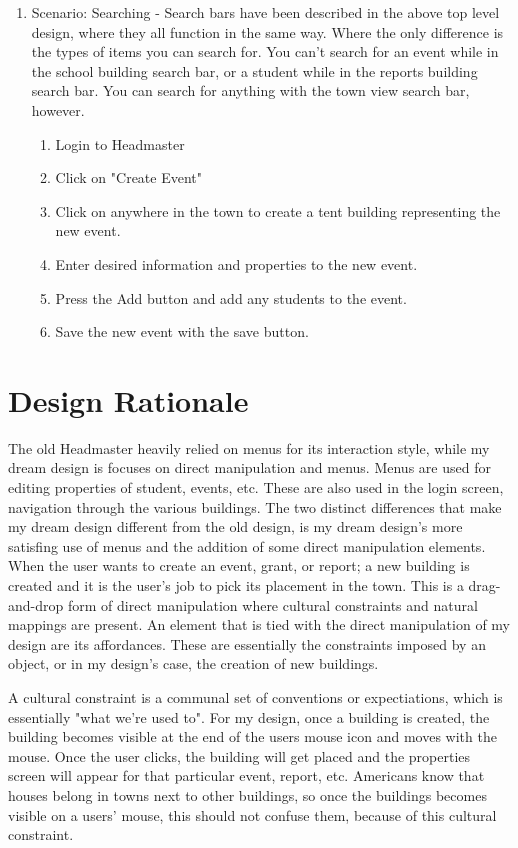 \documentclass[11pt]{article}
\begin{document}
\begin{enumerate}
    \item Scenario: Searching -
Search bars have been described in the above top level design, where they all function in the same way. Where the only difference is the types of items you can search for. You can't search for an event while in the school building search bar, or a student while in the reports building search bar. You can search for anything with the town view search bar, however.
  \begin{enumerate}
        \item Login to Headmaster
        \item Click on "Create Event"
        \item Click on anywhere in the town to create a tent building representing the new event.
        \item Enter desired information and properties to the new event.
        \item Press the Add button and add any students to the event.
        \item Save the new event with the save button.
  \end{enumerate}
\end{enumerate}

\section{Design Rationale}
The old Headmaster heavily relied on menus for its interaction style, while my dream design is focuses on direct manipulation and menus. Menus are used for editing properties of student, events, etc. These are also used in the login screen, navigation through the various buildings. The two distinct differences that make my dream design different from the old design, is my dream design's more satisfing use of menus and the addition of some direct manipulation elements. When the user wants to create an event, grant, or report; a new building is created and it is the user's job to pick its placement in the town. This is a drag-and-drop form of direct manipulation where cultural constraints and natural mappings are present. An element that is tied with the direct manipulation of my design are its affordances. These are essentially the constraints imposed by an object, or in my design's case, the creation of new buildings. 

A cultural constraint is a communal set of conventions or expectiations, which is essentially "what we're used to". For my design, once a building is created, the building becomes visible at the end of the users mouse icon and moves with the mouse. Once the user clicks, the building will get placed and the properties screen will appear for that particular event, report, etc. Americans know that houses belong in towns next to other buildings, so once the buildings becomes visible on a users' mouse, this should not confuse them, because of this cultural constraint. 
\end{document}
